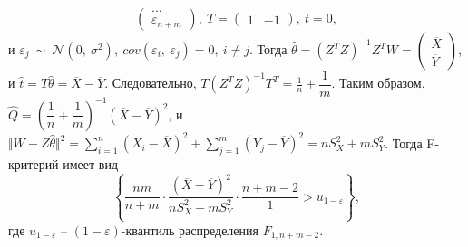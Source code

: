 \begin{example}
\begin{equation*}
\begin{pmatrix}
        \dotsc \\
        \varepsilon _{n+m}
        \end{pmatrix} ,\ T=\begin{pmatrix}
        1 & -1
        \end{pmatrix} ,\ t=0,
    \end{equation*}
     и $\displaystyle \varepsilon _{j} \ \sim \ \mathcal{N}\left( 0,\ \sigma ^{2}\right) ,\ cov( \varepsilon _{i} ,\ \varepsilon _{j}) =0,\ i\neq j$. Тогда $\displaystyle \hat{\theta } =\left( Z^{T} Z\right)^{-1} Z^{T} W=\begin{pmatrix}
    \overline{X}\\
    \overline{Y}
    \end{pmatrix}$, и $\displaystyle \hat{t} =T\hat{\theta } =\overline{X} -\overline{Y}$. Следовательно, $\displaystyle T\left( Z^{T} Z\right)^{-1} T^{T} =\frac{1}{n} +\dfrac{1}{m}$. Таким образом, $\displaystyle \hat{Q} =\left(\dfrac{1}{n} +\dfrac{1}{m}\right)^{-1}(\overline{X} -\overline{Y})^{2}$, и $\displaystyle \Vert W-Z\hat{\theta }\Vert ^{2} =\sum _{i=1}^{n}( X_{i} -\overline{X})^{2} +\sum _{j=1}^{m}( Y_{j} -\overline{Y})^{2} =nS_{X}^{2} +mS_{Y}^{2}$. Тогда F-критерий имеет вид
    \begin{equation*}
        \left\{\dfrac{nm}{n+m} \cdotp \dfrac{(\overline{X} -\overline{Y})^{2}}{nS_{X}^{2} +mS_{Y}^{2}} \cdotp \dfrac{n+m-2}{1}  >u_{1-\varepsilon }\right\} ,
    \end{equation*}
    где $\displaystyle u_{1-\varepsilon }$ -- $\displaystyle ( 1-\varepsilon )$-квантиль распределения $\displaystyle F_{1,n+m-2}$.
\end{example}